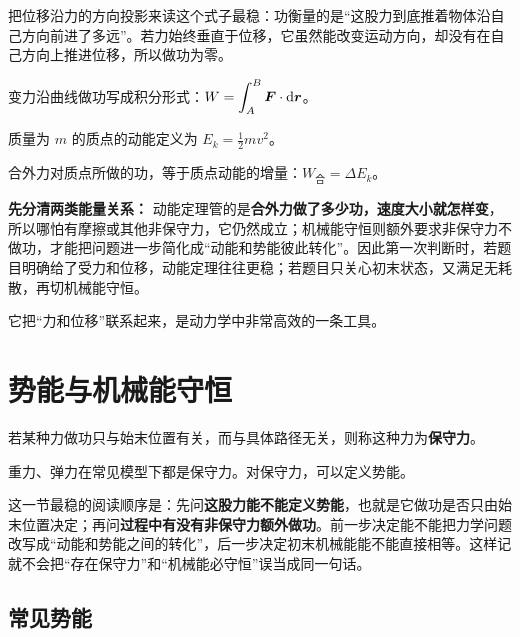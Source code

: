 \documentclass[lang=cn,11pt]{elegantbook}
\newcommand{\bridge}[1]{\begin{note}#1\end{note}}
\begin{document}
\bridge{把位移沿力的方向投影来读这个式子最稳：功衡量的是“这股力到底推着物体沿自己方向前进了多远”。若力始终垂直于位移，它虽然能改变运动方向，却没有在自己方向上推进位移，所以做功为零。}

变力沿曲线做功写成积分形式：\(\displaystyle W=\int_A^B \vb*{F}\cdot \dd \vb*{r}\)。

\begin{definition}[动能]\label{def:kinetic-energy}
质量为 \(m\) 的质点的动能定义为 \(\displaystyle E_k=\frac{1}{2}mv^2\)。
\end{definition}

\begin{theorem}[动能定理]\label{thm:kinetic-energy-theorem}
合外力对质点所做的功，等于质点动能的增量：\(\displaystyle W_{\text{合}}=\Delta E_k\)。
\end{theorem}

\begin{note}
\textbf{先分清两类能量关系：} 动能定理管的是\textbf{合外力做了多少功，速度大小就怎样变}，所以哪怕有摩擦或其他非保守力，它仍然成立；机械能守恒则额外要求非保守力不做功，才能把问题进一步简化成“动能和势能彼此转化”。因此第一次判断时，若题目明确给了受力和位移，动能定理往往更稳；若题目只关心初末状态，又满足无耗散，再切机械能守恒。
\end{note}

它把“力和位移”联系起来，是动力学中非常高效的一条工具。

\section{势能与机械能守恒}

\begin{definition}[保守力]\label{def:conservative-force}
若某种力做功只与始末位置有关，而与具体路径无关，则称这种力为\textbf{保守力}。
\end{definition}

重力、弹力在常见模型下都是保守力。对保守力，可以定义势能。

\begin{note}
这一节最稳的阅读顺序是：先问\textbf{这股力能不能定义势能}，也就是它做功是否只由始末位置决定；再问\textbf{过程中有没有非保守力额外做功}。前一步决定能不能把力学问题改写成“动能和势能之间的转化”，后一步决定初末机械能能不能直接相等。这样记就不会把“存在保守力”和“机械能必守恒”误当成同一句话。
\end{note}

\subsection{常见势能}
\end{document}
